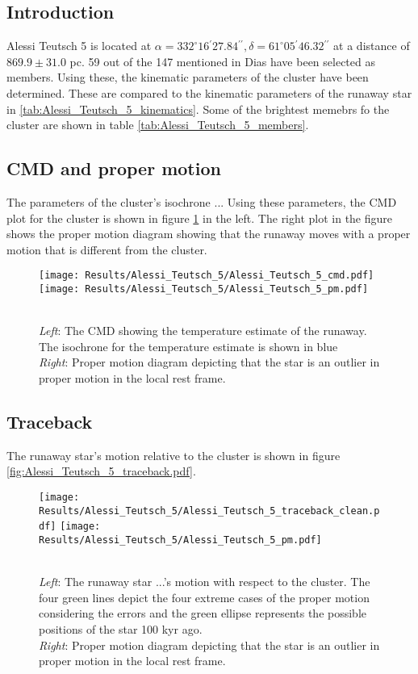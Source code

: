 \subsection{Introduction}
    Alessi Teutsch 5 is located at $\alpha = 332^\circ16{}^\prime27.84{}^{\prime\prime}, \delta = 61^\circ05{}^\prime46.32{}^{\prime\prime}$ at a distance of $869.9\pm31.0$ pc.
    59 out of the 147 mentioned in Dias have been selected as members. Using these, the kinematic parameters of the cluster have been determined. These are compared to the kinematic parameters of the runaway star in \ref{tab:Alessi_Teutsch_5_kinematics}. Some of the brightest memebrs fo the cluster are shown in table \ref{tab:Alessi_Teutsch_5_members}.
    
    \subsection{CMD and proper motion}
    The parameters of the cluster's isochrone ...
    Using these parameters, the CMD plot for the cluster is shown in figure \ref{fig:Alessi_Teutsch_5_cmd_pm} in the left. The right plot in the figure shows the proper motion diagram showing that the runaway moves with a proper motion that is different from the cluster.
    
    \begin{figure}
    \centering
    \texttt{[image: Results/Alessi\_Teutsch\_5/Alessi\_Teutsch\_5\_cmd.pdf]}
    \texttt{[image: Results/Alessi\_Teutsch\_5/Alessi\_Teutsch\_5\_pm.pdf]}
    \caption{\\ 
    \textit{Left}: The CMD showing the temperature estimate of the runaway. The isochrone for the temperature estimate is shown in blue \\
    \textit{Right}: Proper motion diagram depicting that the star is an outlier in proper motion in the local rest frame.}
        \label{fig:Alessi_Teutsch_5_cmd_pm}
    \end{figure}    

    \subsection{Traceback}
    
    The runaway star's motion relative to the cluster is shown in figure \ref{fig:Alessi_Teutsch_5_traceback.pdf}.
    
    \begin{figure}
    \centering
    \texttt{[image: Results/Alessi\_Teutsch\_5/Alessi\_Teutsch\_5\_traceback\_clean.pdf]}
    \texttt{[image: Results/Alessi\_Teutsch\_5/Alessi\_Teutsch\_5\_pm.pdf]}
    \caption{\\ 
    \textit{Left}: The runaway star ...'s motion with respect to the cluster. The four green lines depict the four extreme cases of the proper motion considering the errors and the green ellipse represents the possible positions of the star 100 kyr ago. \\
    \textit{Right}: Proper motion diagram depicting that the star is an outlier in proper motion in the local rest frame.}
        \label{fig:Alessi_Teutsch_5_traceback_clean&pm}
    \end{figure}
    
